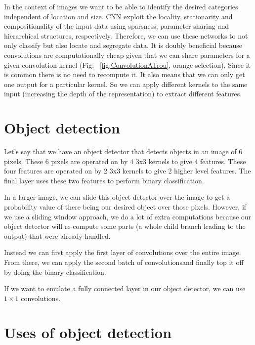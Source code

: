 \vspace{2mm}
\noindent
In the context of images we want to be able to identify the desired categories independent of location and size. CNN exploit the locality, stationarity and compositionality of the input data using sparsness, parameter sharing and hierarchical structures, respectively. 
Therefore, we can use these networks to not only classify but also locate and segregate data. 
It is doubly beneficial because convolutions are computationally cheap given that we can share parameters for a given convolution kernel (Fig. ~\ref{fig:ConvolutionATrou}, orange selection). Since it is common there is no need to recompute it. It also means that we can only get one output for a particular kernel. So we can apply different kernels to the same input (increasing the depth of the representation) to extract different features. 

\section{Object detection}

Let's say that we have an object detector that detects objects in an image of 6 pixels.
These 6 pixels are operated on by 4 3x3 kernels to give 4 features.
These four features are operated on by 2 3x3 kernels to give 2 higher level features.
The final layer uses these two features to perform binary classification.

In a larger image, we can slide this object detector over the image to get a probability value of there being our desired object over those pixels. However, if we use a sliding window approach, we do a lot of extra computations because our object detector will re-compute some parts (a whole child branch leading to the output) that were already handled.

Instead we can first apply the first layer of convolutions over the entire image.
From there, we can apply the second batch of convolutionsand finally top it off by doing the binary classification.

If we want to emulate a fully connected layer in our object detector, we can use $1\times1$ convolutions.

\section{Uses of object detection}

